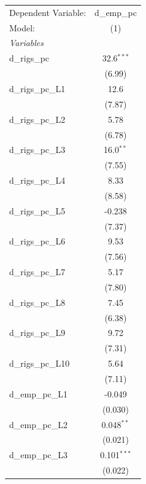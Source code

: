 
\begingroup
\centering
\begin{tabular}{lc}
   \tabularnewline \midrule \midrule
   Dependent Variable:     & d\_emp\_pc\\    
   Model:                  & (1)\\  
   \midrule
   \emph{Variables}\\
   d\_rigs\_pc             & 32.6$^{***}$\\   
                           & (6.99)\\   
   d\_rigs\_pc\_L1         & 12.6\\   
                           & (7.87)\\   
   d\_rigs\_pc\_L2         & 5.78\\   
                           & (6.78)\\   
   d\_rigs\_pc\_L3         & 16.0$^{**}$\\   
                           & (7.55)\\   
   d\_rigs\_pc\_L4         & 8.33\\   
                           & (8.58)\\   
   d\_rigs\_pc\_L5         & -0.238\\   
                           & (7.37)\\   
   d\_rigs\_pc\_L6         & 9.53\\   
                           & (7.56)\\   
   d\_rigs\_pc\_L7         & 5.17\\   
                           & (7.80)\\   
   d\_rigs\_pc\_L8         & 7.45\\   
                           & (6.38)\\   
   d\_rigs\_pc\_L9         & 9.72\\   
                           & (7.31)\\   
   d\_rigs\_pc\_L10        & 5.64\\   
                           & (7.11)\\   
   d\_emp\_pc\_L1          & -0.049\\   
                           & (0.030)\\   
   d\_emp\_pc\_L2          & 0.048$^{**}$\\   
                           & (0.021)\\   
   d\_emp\_pc\_L3          & 0.101$^{***}$\\   
                           & (0.022)\\   

\end{tabular}
